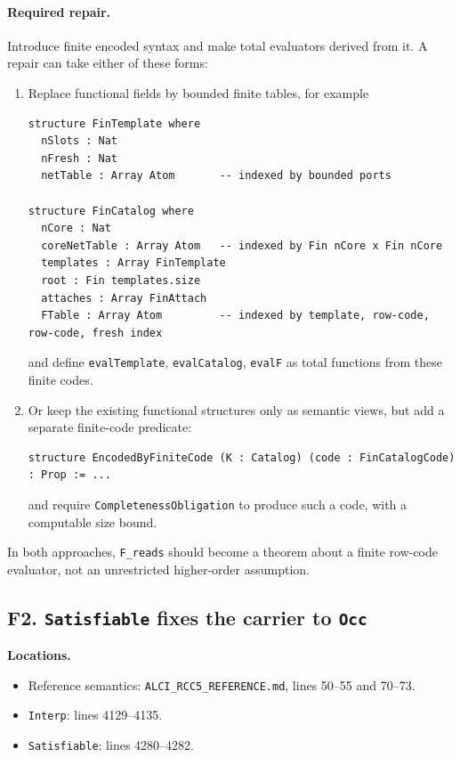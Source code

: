 \documentclass[11pt]{article}
\begin{document}
\paragraph{Required repair.}
Introduce finite encoded syntax and make total evaluators derived from it.  A
repair can take either of these forms:
\begin{enumerate}
  \item Replace functional fields by bounded finite tables, for example
\begin{lstlisting}
structure FinTemplate where
  nSlots : Nat
  nFresh : Nat
  netTable : Array Atom       -- indexed by bounded ports

structure FinCatalog where
  nCore : Nat
  coreNetTable : Array Atom   -- indexed by Fin nCore x Fin nCore
  templates : Array FinTemplate
  root : Fin templates.size
  attaches : Array FinAttach
  FTable : Array Atom         -- indexed by template, row-code, row-code, fresh index
\end{lstlisting}
  and define \texttt{evalTemplate}, \texttt{evalCatalog}, \texttt{evalF} as
  total functions from these finite codes.

  \item Or keep the existing functional structures only as semantic views, but
  add a separate finite-code predicate:
\begin{lstlisting}
structure EncodedByFiniteCode (K : Catalog) (code : FinCatalogCode) : Prop := ...
\end{lstlisting}
  and require \texttt{CompletenessObligation} to produce such a code, with a
  computable size bound.
\end{enumerate}
In both approaches, \texttt{F\_reads} should become a theorem about a finite
row-code evaluator, not an unrestricted higher-order assumption.

\subsection{F2. \texttt{Satisfiable} fixes the carrier to \texttt{Occ}}

\textbf{Locations.}
\begin{itemize}
  \item Reference semantics: \texttt{ALCI\_RCC5\_REFERENCE.md}, lines 50--55
        and 70--73.
  \item \texttt{Interp}: lines 4129--4135.
  \item \texttt{Satisfiable}: lines 4280--4282.
\end{itemize}
\end{document}
